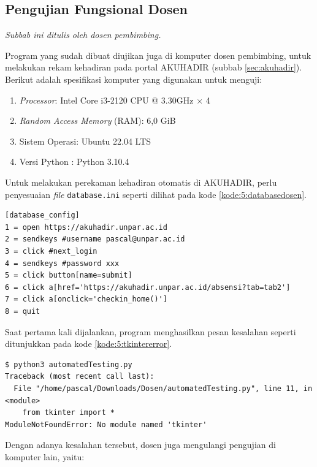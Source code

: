\subsection{Pengujian Fungsional Dosen}

\textit{Subbab ini ditulis oleh dosen pembimbing.}

Program yang sudah dibuat diujikan juga di komputer dosen pembimbing, untuk melakukan rekam kehadiran pada portal AKUHADIR (subbab \ref{sec:akuhadir}). Berikut adalah spesifikasi komputer yang digunakan untuk menguji:

\begin{enumerate}
	\item \textit{Processor}: Intel Core i3-2120 CPU @ 3.30GHz $\times$ 4
	\item \textit{Random Access Memory} (RAM): 6,0 GiB
	\item Sistem Operasi: Ubuntu 22.04 LTS
	\item Versi Python : Python 3.10.4
\end{enumerate}

Untuk melakukan perekaman kehadiran otomatis di AKUHADIR, perlu penyesuaian \textit{file} \texttt{database.ini} seperti dilihat pada kode \ref{kode:5:databasedosen}.

\begin{lstlisting}[caption=\textit{File} \texttt{database.ini} AKUHADIR (\textit{password} disembunyikan), label=kode:5:databasedosen]
[database_config]
1 = open https://akuhadir.unpar.ac.id
2 = sendkeys #username pascal@unpar.ac.id
3 = click #next_login
4 = sendkeys #password xxx
5 = click button[name=submit]
6 = click a[href='https://akuhadir.unpar.ac.id/absensi?tab=tab2']
7 = click a[onclick='checkin_home()']
8 = quit
\end{lstlisting}

Saat pertama kali dijalankan, program menghasilkan pesan kesalahan seperti ditunjukkan pada kode \ref{kode:5:tkintererror}.

\begin{lstlisting}[caption=Pesan kesalahan program tanpa \textit{tkinter}, label=kode:5:tkintererror]
$ python3 automatedTesting.py 
Traceback (most recent call last):
  File "/home/pascal/Downloads/Dosen/automatedTesting.py", line 11, in <module>
    from tkinter import * 
ModuleNotFoundError: No module named 'tkinter'
\end{lstlisting}

Dengan adanya kesalahan tersebut, dosen juga mengulangi pengujian di komputer lain, yaitu:

